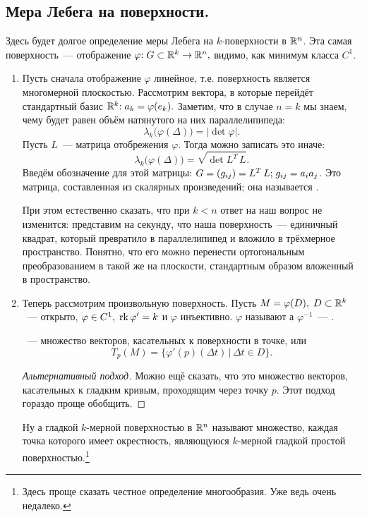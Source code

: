 \documentclass{notes}
\begin{document}
\subsection{Мера Лебега на поверхности.}

	Здесь будет долгое определение меры Лебега на $k$-поверхности в $\mathbb{R}^n$. Эта самая поверхность~--- отображение $\varphi \text{\text{:}} \; G \subset \mathbb{R}^k \to \mathbb{R}^n,$ видимо, как минимум класса $C^1$.
	\begin{enumerate}
		\item Пусть сначала отображение $\varphi$ линейное, т.е. поверхность является многомерной плоскостью. Рассмотрим вектора, в которые перейдёт стандартный базис $\mathbb{R}^k\text{\text{:}} \; a_k = \varphi(e_k).$ Заметим, что в случае $n = k$ мы знаем, чему будет равен объём натянутого на них параллелипипеда:
		\[
			\lambda_k\big(\varphi(\Delta)\big) = |\det \varphi|.
		\]
		Пусть $L$~--- матрица отобрежения $\varphi$.
		Тогда можно записать это иначе: 
		\[
			\lambda_k\big(\varphi(\Delta)\big) = \sqrt{\det L^{T} \, L}.
		\]
		Введём обозначение для этой матрицы: $G = (g_{ij}) = L^T \, L\text{\text{;}} \; g_{ij} = a_i a_j$.
		Это матрица, составленная из скалярных произведений; она называется .

		При этом естественно сказать, что при $k < n$ ответ на наш вопрос не изменится: представим на секунду, что наша поверхность~--- единичный квадрат, который превратило в параллелипипед и вложило в трёхмерное пространство. Понятно, что его можно перенести ортогональным преобразованием в такой же на плоскости, стандартным образом вложенный в пространство.
		\item Теперь рассмотрим произвольную  поверхность. Пусть $M = \varphi(D), \; D \subset \mathbb{R}^k$~--- открыто, $\varphi \in C^1, \; \operatorname{rk} \varphi' = k$ и $\varphi$ инъективно. $\varphi$ называют  а $\varphi^{-1}$~--- .

		\begin{de}
			~--- множество векторов, касательных к поверхности в точке, или
			\[
				T_p(M) = \{\varphi'(p) (\Delta t) \, | \, \Delta t \in D\}.
			\]
			\begin{proof}[Альтернативный подход]
				Можно ещё сказать, что это множество векторов, касательных к гладким кривым, проходящим через точку $p$. Этот подход гораздо проще обобщить.
			\end{proof}
		\end{de}

		\begin{de}
			Ну а гладкой $k$-мерной поверхностью в $\mathbb{R}^n$ называют множество, каждая точка которого имеет окрестность, являющуюся $k$-мерной гладкой простой поверхностью.\footnote{Здесь проще сказать честное определение многообразия. Уже ведь очень недалеко.}
		\end{de}


\end{enumerate}
\end{document}

